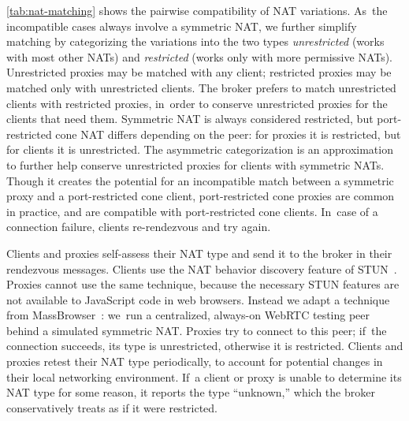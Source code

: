 \documentclass[letterpaper,twocolumn]{article}
\newcommand{\firstterm}[1]{\textit{#1}}
\begin{document}
\autoref{tab:nat-matching}
shows the pairwise compatibility of NAT variations.
As~the incompatible cases always involve a symmetric NAT,
we further simplify matching by categorizing the variations into the two types
\firstterm{unrestricted} (works with most other NATs) and
\firstterm{restricted} (works only with more permissive NATs).
Unrestricted proxies may be matched with any client;
restricted proxies may be matched only with unrestricted clients.
The broker prefers to match unrestricted clients with restricted proxies,
in~order to conserve unrestricted proxies
for the clients that need them.
Symmetric NAT is always considered restricted,
but port-restricted cone NAT differs
depending on the peer:
for proxies it is restricted, but
for clients it is unrestricted.
The asymmetric categorization is an approximation
to further help conserve unrestricted proxies
for clients with symmetric NATs.
Though it creates the potential for an incompatible match
between a symmetric proxy and a port-restricted cone client,
port-restricted cone proxies are common in practice,
and are compatible with port-restricted cone clients.
In~case of a connection failure,
clients re-rendezvous and try again.

Clients and proxies self-assess their NAT type
and send it to the broker in their rendezvous messages.
Clients use the NAT behavior discovery feature of STUN~\cite{rfc5780}.
Proxies cannot use the same technique,
because the necessary STUN features are not available
to JavaScript code in web browsers.
Instead
we adapt a technique from MassBrowser~\cite[\S \mbox{V-A}]{Nasr2020a}:
we~run a centralized, always-on WebRTC testing peer
behind a simulated symmetric NAT.
Proxies try to connect to this peer;
if~the connection succeeds, its type is unrestricted,
otherwise it is restricted.
Clients and proxies retest their NAT type periodically,
to account for potential changes in their local networking environment.
If~a client or proxy is unable to determine its NAT type for some reason,
it reports the type ``unknown,''
which the broker conservatively treats as if it were restricted.
\end{document}
